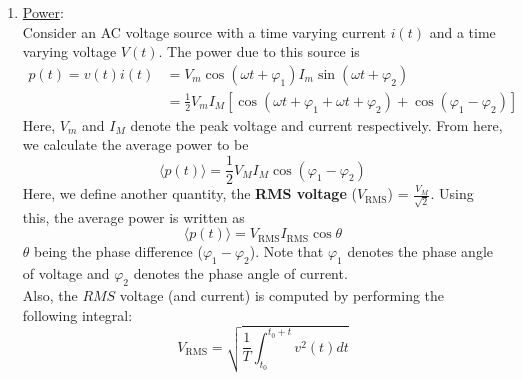 \documentclass[a4paper]{article}
\begin{document}
\begin{itemize}
\begin{enumerate}
    \item \underline{Power}:\\
      Consider an AC voltage source with a time varying current $i(t)$ and a time varying voltage $V(t)$. The power due to this source is
      \begin{align*}
        p(t) = v(t)i(t) &= V_m\cos{(\omega t + \varphi_1)}I_m\sin{(\omega t + \varphi_2)}\\
        &= \frac{1}{2}V_mI_M[\cos{(\omega t + \varphi_1 + \omega t + \varphi_2)} + \cos(\varphi_1-\varphi_2)]
      \end{align*}
      Here, $V_m$ and $I_M$ denote the peak voltage and current respectively. From here, we calculate the average power to be
      \begin{equation*}
        \langle p(t)\rangle = \frac{1}{2}V_MI_M\cos{(\varphi_1-\varphi_2)}
      \end{equation*}
      Here, we define another quantity, the \textbf{RMS voltage} ($V_{\text{RMS}}$) = $\frac{V_M}{\sqrt{2}}$. Using this, the average power is written as
      \begin{equation*}
        \langle p(t)\rangle = V_{\text{RMS}}I_{\text{RMS}}\cos{\theta}
      \end{equation*}
      $\theta$ being the phase difference ($\varphi_1 - \varphi_2$). Note that $\varphi_1$ denotes the phase angle of voltage and $\varphi_2$ denotes the phase angle of current.\\
      Also, the $RMS$ voltage (and current) is computed by performing the following integral:
      \begin{equation*}
        V_{\text{RMS}} = \sqrt{\frac{1}{T}\int_{t_0}^{t_0+t}v^2(t)dt}
      \end{equation*}
    \end{enumerate}
\end{itemize}
\end{document}
